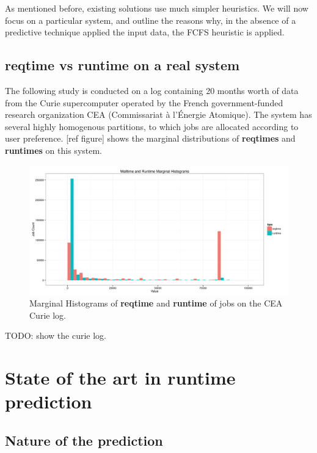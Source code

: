 \documentclass{article}
\begin{document}
As mentioned before, existing solutions use much simpler heuristics. We will now focus on a particular system, and outline the reasons why, in the absence of a predictive technique applied the input data, the FCFS heuristic is applied.

\subsection{\textbf{reqtime} vs \textbf{runtime} on a real system}
\label{sub:reqtime_vs_runtime_on_a_real_system}
The following study is conducted on a log containing 20 months worth of data from the Curie supercomputer operated by the French government-funded research organization CEA (Commissariat à l'Énergie Atomique).
The system has several highly homogenous partitions, to which jobs are allocated according to user preference.
[ref figure] shows the marginal distributions of \textbf{reqtimes} and \textbf{runtimes} on this system.
\begin{figure}[H]
        \centering
        \includegraphics[width=\textwidth]{../../wallimage-0.png}
        \caption{Marginal Histograms of \textbf{reqtime} and \textbf{runtime} of jobs on the CEA Curie log.}
        \label{fig:_wall_run_for_report_pdf}
\end{figure}





TODO: show the curie log.



\section{State of the art in \textbf{runtime} prediction}


\subsection{Nature of the prediction}
\label{sub:nature_of_the_prediction}
\end{document}
